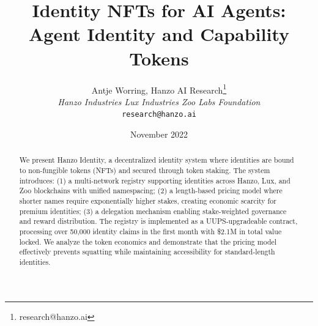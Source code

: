 \documentclass[11pt,twocolumn]{article}
\title{Identity NFTs for AI Agents: Agent Identity and Capability Tokens}
\author{Antje Worring, Hanzo AI Research\thanks{research@hanzo.ai} \\ \textit{Hanzo Industries \quad Lux Industries \quad Zoo Labs Foundation} \\ \texttt{research@hanzo.ai}}
\date{November 2022}
\begin{document}
\hanzocoverpage

\begin{abstract}
We present Hanzo Identity, a decentralized identity system where identities are bound to non-fungible tokens (NFTs) and secured through token staking. The system introduces: (1) a multi-network registry supporting identities across Hanzo, Lux, and Zoo blockchains with unified namespacing; (2) a length-based pricing model where shorter names require exponentially higher stakes, creating economic scarcity for premium identities; (3) a delegation mechanism enabling stake-weighted governance and reward distribution. The registry is implemented as a UUPS-upgradeable contract, processing over 50,000 identity claims in the first month with \$2.1M in total value locked. We analyze the token economics and demonstrate that the pricing model effectively prevents squatting while maintaining accessibility for standard-length identities.
\end{abstract}









\end{document}

